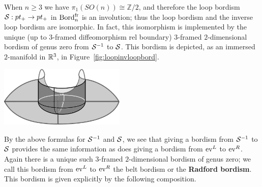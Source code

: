 \documentclass{amsart}
\begin{document}
When $n\geq 3$ we have $\pi_1(SO(n)) \cong \mathbb{Z}/2$, and therefore the loop bordism $\mathcal S: pt_+ \rightarrow pt_+$ in $\mathrm{Bord}^\mathrm{fr}_n$ is an involution; thus the loop bordism and the inverse loop bordism are isomorphic.  In fact, this isomorphism is implemented by the unique (up to $3$-framed diffeomorphism rel boundary) $3$-framed $2$-dimensional bordism of genus zero from $\mathcal S^{-1}$ to $\mathcal S$. This bordism is depicted, as an immersed $2$-manifold in $\mathbb R^3$, in Figure~\ref{fig:loopinvloopbord}.
\begin{center}
\includegraphics[width=60mm]{cobordism.png}
\end{center}


By the above formulas for $\mathcal S^{-1}$ and $\mathcal S$, we see that giving a bordism from $\mathcal S^{-1}$ to $\mathcal S$ provides the same information as does giving a bordism from $\mathrm{ev}^L$ to $\mathrm{ev}^R$.  Again there is a unique such $3$-framed $2$-dimensional bordism of genus zero; we call this bordism from $\mathrm{ev}^L$ to $\mathrm{ev}^R$ the belt bordism or the {\bfseries Radford bordism}.  This bordism is given explicitly by the following composition.
\end{document}
